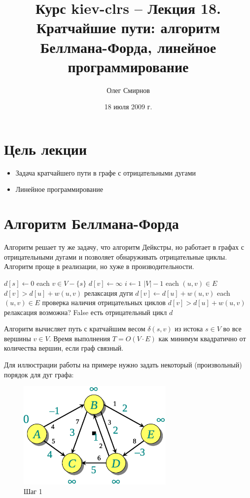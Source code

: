\documentclass[11pt]{article}
\author{Олег Смирнов}
\title{Курс kiev-clrs -- Лекция 18. Кратчайшие пути: алгоритм Беллмана-Форда, линейное программирование}
\date{18 июля 2009 г.}
\begin{document}
\maketitle
\tableofcontents
\newpage
\setlength{\parskip}{1ex plus 0.5ex minus 0.2ex}
\section{Цель лекции}
\begin{itemize}
\item Задача кратчайшего пути в графе с отрицательными дугами
\item Линейное программирование
\end{itemize}

\section{Алгоритм Беллмана-Форда}
Алгоритм решает ту же задачу, что алгоритм Дейкстры, но работает в графах с отрицательными дугами и позволяет обнаруживать отрицательные циклы. Алгоритм проще в реализации, но хуже в производительности.
\begin{codebox}
\li $d[s] \gets 0$
\li \For each $v \in V - \{s\}$
\li     \Do $d[v] \gets \infty$ 
    \End
\li \For $i \gets 1$ \To $|V|-1$
\li     \Do \For each $(u, v) \in E$
\li        \Do \If $d[v] > d[u] + w(u, v)$ \Comment релаксация дуги
\li            \Then $d[v] \gets d[u] + w(u, v)$
               \End
           \End
    \End
\li \For each $(u, v) \in E$ \Comment проверка наличия отрицательных циклов
\li     \Do \If $d[v] > d[u] + w(u, v)$ \Comment релаксация возможна?
\li         \Then \Return False \Comment есть отрицательный цикл
            \End
        \End
\li \Return $d$
\end{codebox}
Алгоритм вычисляет путь с кратчайшим весом $\delta(s, v)$ из истока $s \in V$ во все вершины $v \in V$. Время выполнения $T = O(V \cdot E)$ как минимум квадратично от количества вершин, если граф связный.

Для иллюстрации работы на примере нужно задать некоторый (произвольный) порядок для дуг графа:
\begin{figure}[h!]
  \centering
  \includegraphics[width=3in]{lecture18/bellmanford1.eps}
  \caption{Шаг 1}
\end{figure}
\end{document}
